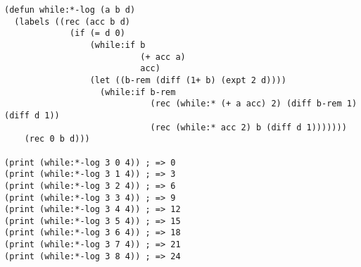 \documentclass{article}
\begin{document}
\lstset{language=Lisp,label= ,caption= ,captionpos=b,numbers=none}
\begin{lstlisting}
(defun while:*-log (a b d)
  (labels ((rec (acc b d)
             (if (= d 0)
                 (while:if b
                           (+ acc a)
                           acc)
                 (let ((b-rem (diff (1+ b) (expt 2 d))))
                   (while:if b-rem
                             (rec (while:* (+ a acc) 2) (diff b-rem 1) (diff d 1))
                             (rec (while:* acc 2) b (diff d 1)))))))
    (rec 0 b d)))

(print (while:*-log 3 0 4)) ; => 0
(print (while:*-log 3 1 4)) ; => 3
(print (while:*-log 3 2 4)) ; => 6
(print (while:*-log 3 3 4)) ; => 9
(print (while:*-log 3 4 4)) ; => 12
(print (while:*-log 3 5 4)) ; => 15
(print (while:*-log 3 6 4)) ; => 18
(print (while:*-log 3 7 4)) ; => 21
(print (while:*-log 3 8 4)) ; => 24
\end{lstlisting}
\end{document}
